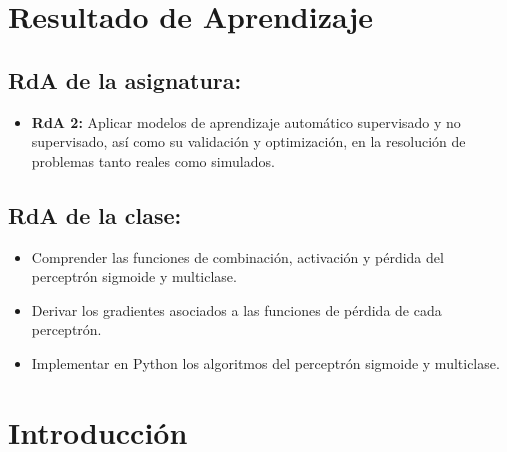 \documentclass[a4,11pt]{aleph-notas}
\begin{document}
\encabezado


\section*{Resultado de Aprendizaje}

\subsection*{RdA de la asignatura:}
\begin{itemize}[leftmargin=*]
    \item \textbf{RdA 2:} 
    Aplicar modelos de aprendizaje automático supervisado y no supervisado, así como su validación y optimización, en la resolución de problemas tanto reales como simulados.
\end{itemize}

\subsection*{RdA de la clase:}
\begin{itemize}[leftmargin=*]
    \item Comprender las funciones de combinación, activación y pérdida del perceptrón sigmoide y multiclase.
    \item Derivar los gradientes asociados a las funciones de pérdida de cada perceptrón.
    \item Implementar en Python los algoritmos del perceptrón sigmoide y multiclase.
\end{itemize}

\section*{Introducción}
\end{document}
